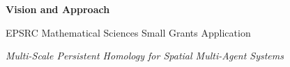 \documentclass[11pt,a4paper]{article}
\begin{document}
\begin{center}
  {\Large\bfseries Vision and Approach\par}
  \vspace{0.5em}
  {\normalsize EPSRC Mathematical Sciences Small Grants Application\par}
  \vspace{0.25em}
  {\normalsize\itshape Multi-Scale Persistent Homology for Spatial Multi-Agent Systems\par}
\end{center}

\vspace{0.75em}





\end{document}
